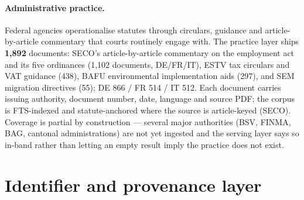 \documentclass[11pt,a4paper]{article}
\begin{document}
\paragraph{Administrative practice.} Federal agencies operationalise statutes through circulars, guidance and article-by-article commentary that courts routinely engage with. The practice layer ships \textbf{1{,}892} documents: SECO's article-by-article commentary on the employment act and its five ordinances (1{,}102 documents, DE/FR/IT), ESTV tax circulars and VAT guidance (438), BAFU environmental implementation aids (297), and SEM migration directives (55); DE 866 / FR 514 / IT 512. Each document carries issuing authority, document number, date, language and source PDF; the corpus is FTS-indexed and statute-anchored where the source is article-keyed (SECO). Coverage is partial by construction --- several major authorities (BSV, FINMA, BAG, cantonal administrations) are not yet ingested and the serving layer says so in-band rather than letting an empty result imply the practice does not exist.

\section{Identifier and provenance layer}\label{sec:provenance}
\end{document}
